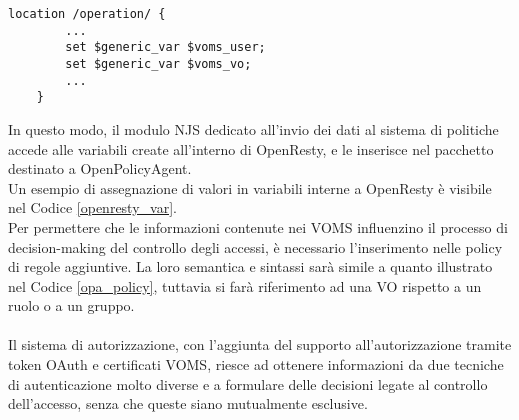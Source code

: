 \begin{lstlisting}[caption={Assegnazione di variabili in OpenResty},captionpos=b,label=openresty_var]
    location /operation/ {
        ...
        set $generic_var $voms_user;
        set $generic_var $voms_vo;
        ...
    }
\end{lstlisting}
In questo modo, il modulo NJS dedicato all'invio dei dati al sistema di politiche accede alle variabili create all'interno di OpenResty, 
e le inserisce nel pacchetto destinato a OpenPolicyAgent. 
\\Un esempio di assegnazione di valori in variabili interne a 
OpenResty è visibile nel Codice \ref{openresty_var}.
\\ Per permettere che le informazioni contenute nei VOMS influenzino il processo di decision-making del controllo degli accessi,
 è necessario l'inserimento nelle policy di regole aggiuntive. La loro semantica e sintassi sarà simile a quanto illustrato nel Codice \ref*{opa_policy},
tuttavia si farà riferimento ad una VO rispetto a un ruolo o a un gruppo.
\\ \\ Il sistema di autorizzazione, con l'aggiunta del supporto all'autorizzazione tramite token OAuth e certificati VOMS, riesce ad ottenere informazioni 
da due tecniche di autenticazione molto diverse e a formulare delle decisioni legate al controllo dell'accesso, senza che queste siano mutualmente esclusive. 


